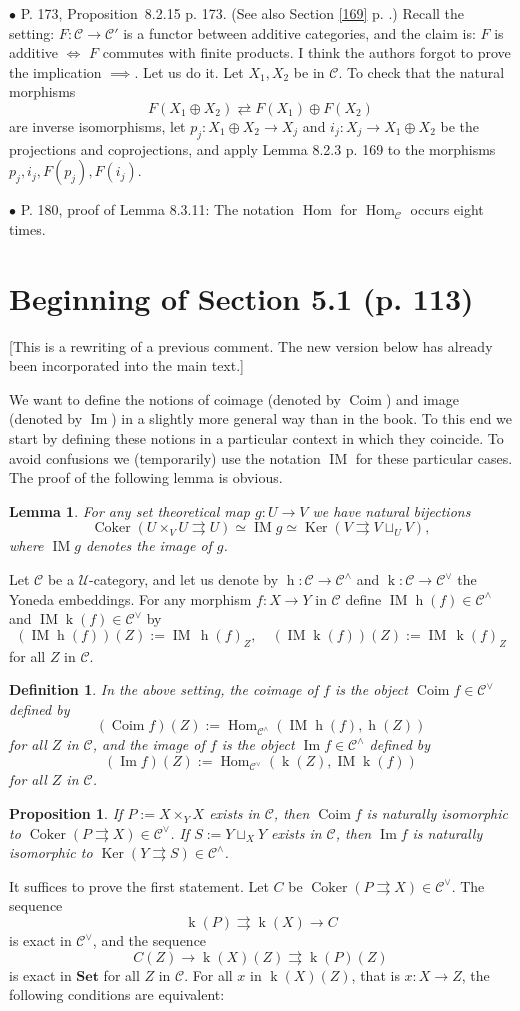 \documentclass[12pt]{article}
\newtheorem{lem}[thm]{Lemma}
\newtheorem{prop}[thm]{Proposition}
\newtheorem{defn}[thm]{Definition}
\newcommand{\bu}{\bullet}
\newcommand{\n}{\noindent}
\newcommand{\C}{\mathcal C}
\newcommand{\U}{\mathcal U}
\newcommand{\Set}{\textbf{Set}}
\newcommand{\pa}{\rightrightarrows}
\newcommand{\be}{\begin{equation}}
\newcommand{\ee}{\end{equation}}
\newcommand{\pr}{Proposition}
\newcommand{\rw}{[This is a rewriting of a previous comment. The new version below has already been incorporated into the main text.]}
\DeclareMathOperator{\Coim}{Coim}
\DeclareMathOperator{\Coker}{Coker}
\DeclareMathOperator{\Ima}{Im}
\DeclareMathOperator{\IM}{IM}
\DeclareMathOperator{\hy}{h}
\DeclareMathOperator{\ky}{k}
\DeclareMathOperator{\h}{Hom}
\DeclareMathOperator{\Ker}{Ker}
\begin{document}

\n$\bu$ P. 173, \pr\ 8.2.15 p. 173. (See also Section \ref{169} p. \pageref{169}.) Recall the setting: $F:\C\to\C'$ is a functor between additive categories, and the claim is: $F$ is additive $\iff$ $F$ commutes with finite products. I think the authors forgot to prove the implication $\implies$. Let us do it. Let $X_1,X_2$ be in $\C$. To check that the natural morphisms 
%
\be\label{173}
F(X_1\oplus X_2)\rightleftarrows F(X_1)\oplus F(X_2)
\ee 
% 
are inverse isomorphisms, let $p_j:X_1\oplus X_2\to X_j$ and $i_j:X_j\to X_1\oplus X_2$ be the projections and coprojections, and apply Lemma 8.2.3 p. 169 to the morphisms $p_j,i_j,F(p_j),F(i_j)$. 


\n$\bu$ P. 180, proof of Lemma 8.3.11: The notation $\h$ for $\h_\C$ occurs eight times. 

% 
\section{Beginning of Section 5.1 (p. 113)} 
% 
\rw 

We want to define the notions of coimage (denoted by $\Coim$) and image (denoted by $\Ima$) in a slightly more general way than in the book. To this end we start by defining these notions in a particular context in which they coincide. To avoid confusions we (temporarily) use the notation $\IM$ for these particular cases. The proof of the following lemma is obvious. 
%
\begin{lem}\label{imset} 
For any set theoretical map $g:U\to V$ we have natural bijections 
$$ 
\Coker(U\times_VU\pa U)\simeq\IM g\simeq\Ker(V\pa V\sqcup_UV),
$$ 
where $\IM g$ denotes the image of $g$. 
\end{lem} 

Let $\C$ be a $\U$-category, and let us denote by $\hy:\C\to\C^\wedge$ and $\ky:\C\to\C^\vee$ the Yoneda embeddings. For any morphism $f:X\to Y$ in $\C$ define $\IM\hy(f)\in\C^\wedge$ and $\IM\ky(f)\in\C^\vee$ by 
$$ 
(\IM\hy(f))(Z):=\IM\,\hy(f)_Z,\quad(\IM\ky(f))(Z):=\IM\,\ky(f)_Z 
$$ 
for all $Z$ in $\C$. 
%
\begin{defn} 
In the above setting, the {\em coimage} of $f$ is the object $\Coim f\in\C^\vee$ defined by 
$$ 
(\Coim f)(Z):=\h_{\C^\wedge}(\IM\hy(f),\hy(Z))
$$ 
for all $Z$ in $\C$, and the {\em image} of $f$ is the object $\Ima f\in\C^\wedge$ defined by 
$$ 
(\Ima f)(Z):=\h_{\C^\vee}(\ky(Z),\IM\ky(f)) 
$$ 
for all $Z$ in $\C$. 
\end{defn} 
% 
\begin{prop}\label{coimim}
If $P:=X\times_YX$ exists in $\C$, then $\Coim f$ is naturally isomorphic to $\Coker(P\pa X)\in\C^\vee$. If $S:=Y\sqcup_XY$ exists in $\C$, then $\Ima f$ is naturally isomorphic to $\Ker(Y\pa S)\in\C^\wedge$. 
\end{prop} 
% 
\n{\em Proof.} It suffices to prove the first statement. Let $C$ be $\Coker(P\pa X)\in\C^\vee$. The sequence  
$$ 
\ky(P)\pa\ky(X)\to C 
$$ 
is exact in $\C^\vee$, and the sequence 
$$ 
C(Z)\to\ky(X)(Z)\pa\ky(P)(Z) 
$$ 
is exact in $\Set$ for all $Z$ in $\C$. For all $x$ in $\ky(X)(Z)$, that is $x:X\to Z$, the following conditions are equivalent: 
\end{document}
